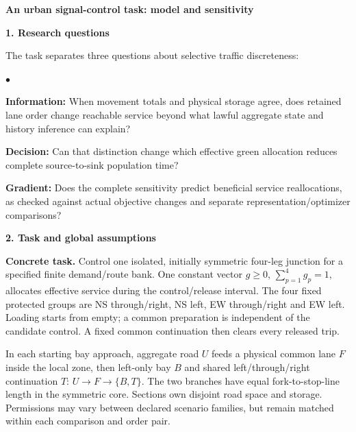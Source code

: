 \documentclass[10pt,a4paper]{article}
\newcommand{\head}[1]{\par\vspace{4pt}\noindent\textbf{#1}\par\nobreak\vspace{1pt}}
\newenvironment{points}{\begin{list}{$\bullet$}{%
 \setlength{\leftmargin}{1.4em}\setlength{\labelwidth}{0.7em}%
 \setlength{\labelsep}{0.4em}\setlength{\itemsep}{2pt}%
 \setlength{\parsep}{0pt}\setlength{\topsep}{3pt}}}{\end{list}}
\begin{document}
\begin{center}
{\large\bfseries An urban signal-control task: model and sensitivity}
\end{center}
\vspace{-5pt}

\head{1. Research questions}
The task separates three questions about selective traffic discreteness:
\begin{points}
\item \textbf{Information:} When movement totals and physical storage agree,
does retained lane order change reachable service beyond what lawful
aggregate state and history inference can explain?
\item \textbf{Decision:} Can that distinction change which effective green
allocation reduces complete source-to-sink population time?
\item \textbf{Gradient:} Does the complete sensitivity predict beneficial
service reallocations, as checked against actual objective changes and
separate representation/optimizer comparisons?
\end{points}

\head{2. Task and global assumptions}
\textbf{Concrete task.} Control one isolated, initially symmetric four-leg
junction for a specified finite demand/route bank. One constant vector
$g\geq0$, $\sum_{p=1}^4g_p=1$, allocates effective service during the
control/release interval. The four fixed protected groups are NS
through/right, NS left, EW through/right and EW left. Loading starts
from empty; a common preparation is independent of the candidate control.
A fixed common continuation then clears every released trip.

In each starting bay approach, aggregate road $U$ feeds a physical
common lane $F$ inside the local zone, then left-only bay $B$ and shared
left/through/right continuation $T$: $U\to F\to\{B,T\}$.
The two branches have equal fork-to-stop-line length in the symmetric
core. Sections own disjoint road space and storage. Permissions may vary
between declared scenario families, but remain matched within each
comparison and order pair.
\end{document}
